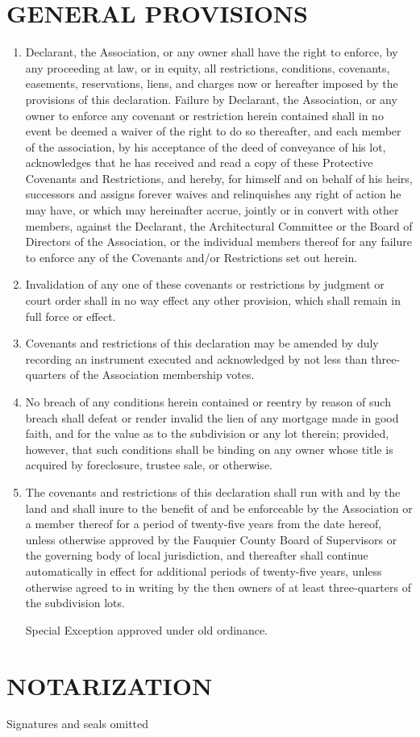 \documentclass[10pt, letterpaper]{article}
\begin{document}
\section{GENERAL PROVISIONS}
\begin{enumerate}
  \item Declarant, the Association, or any owner shall have the right to enforce, by any proceeding at law, or in equity, all restrictions, conditions, covenants, easements, reservations, liens, and charges now or hereafter imposed by the provisions of this declaration.
    Failure by Declarant, the Association, or any owner to enforce any covenant or restriction herein contained shall in no event be deemed a waiver of the right to do so thereafter, and each member of the association, by his acceptance of the deed of conveyance of his lot, acknowledges that he has received and read a copy of these Protective Covenants and Restrictions, and hereby, for himself and on behalf of his heirs, successors and assigns forever waives and relinquishes any right of action he may have, or which may hereinafter accrue, jointly or in convert with other members, against the Declarant, the Architectural Committee or the Board of Directors of the Association, or the individual members thereof for any failure to enforce any of the Covenants and/or Restrictions set out herein.
  \item Invalidation of any one of these covenants or restrictions by judgment or court order shall in no way effect any other provision, which shall remain in full force or effect.
  \item Covenants and restrictions of this declaration may be amended by duly recording an instrument executed and acknowledged by not less than three-quarters of the Association membership votes.
  \item No breach of any conditions herein contained or reentry by reason of such breach shall defeat or render invalid the lien of any mortgage made in good faith, and for the value as to the subdivision or any lot therein; provided, however, that such conditions shall be binding on any owner whose title is acquired by foreclosure, trustee sale, or otherwise.
  \item The covenants and restrictions of this declaration shall run with and by the land and shall inure to the benefit of and be enforceable by the Association or a member thereof for a period of twenty-five years from the date hereof, unless otherwise approved by the Fauquier County Board of Supervisors or the governing body of local jurisdiction, and thereafter shall continue automatically in effect for additional periods of twenty-five years, unless otherwise agreed to in writing by the then owners of at least three-quarters of the subdivision lots.

    Special Exception approved under old ordinance.
\end{enumerate}

\section{NOTARIZATION}
Signatures and seals omitted
\end{document}
